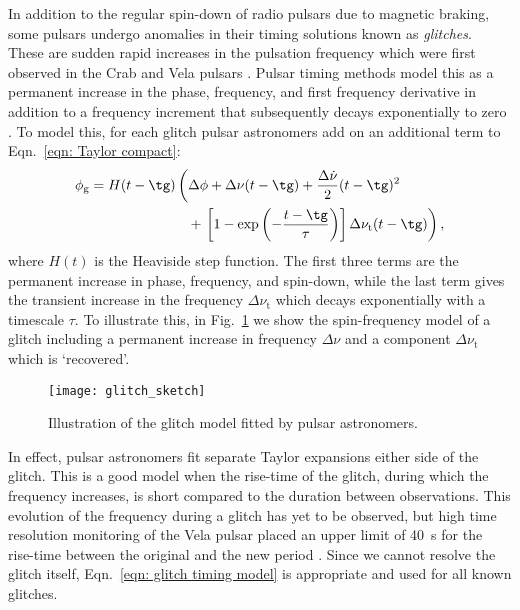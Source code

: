 In addition to the regular spin-down of radio pulsars due to magnetic braking,
some pulsars undergo anomalies in their timing solutions known as
\emph{glitches}.  These are sudden rapid increases in the pulsation frequency
which were first observed in the Crab \citep{Boynton1969, Richards1969} and
Vela pulsars \citep{RadhakrishnanManchester1969, Reichley1969}. Pulsar
timing methods model this as a permanent increase in the phase, frequency, and
first frequency derivative in addition to a frequency increment that
subsequently decays exponentially to zero \citep{Edwards2006}.  To model this,
for each glitch pulsar astronomers add on an additional term to
Eqn.~\eqref{eqn: Taylor compact}:
\begin{align}
\begin{split}
\phi_{\textrm{g}} = H(t - \tg)& {}\left(
\Delta\phi + \Delta\nu(t - \tg) + \frac{\Delta\dot{\nu}}{2}(t - \tg)^{2} \right.\\
& \hspace{3mm}+ \left.\left[1-\exp\left(-\frac{t - \tg}{\tau}\right)\right]
\Delta\nu_{\textrm{t}}(t - \tg)
\right),
\end{split}
\label{eqn: glitch timing model}
\end{align}
where $H(t)$ is the Heaviside step function. The first
three terms are the permanent increase in phase, frequency, and spin-down,
while the last term gives the transient increase in the frequency
$\Delta\nu_{\textrm{t}}$ which decays exponentially with a timescale $\tau$.
To illustrate this, in Fig.~\ref{fig: glitch sketch} we show the spin-frequency
model of a glitch including a permanent increase in frequency $\Delta\nu$ and
a component $\Delta\nu_{\textrm{t}}$ which is `recovered'.
\begin{figure}[htb]
\centering
\texttt{[image: glitch\_sketch]}
\caption{Illustration of the glitch model fitted by pulsar astronomers.}
\label{fig: glitch sketch}
\end{figure}

In effect, pulsar astronomers fit separate Taylor expansions either side of the
glitch. This is a good model when the rise-time of the glitch, during which the
frequency increases, is short compared to the duration between observations.
This evolution of the frequency during a glitch has yet to be observed, but
high time resolution monitoring of the Vela pulsar placed an upper limit of
40~s for the rise-time between the original and the new period
\citep{Dodson2001}. Since we cannot resolve the glitch itself,
Eqn.~\eqref{eqn: glitch timing model} is appropriate and used for all known
glitches.

